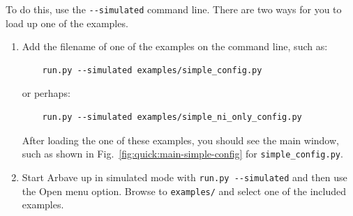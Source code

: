 To do this, use the \verb|--simulated| command line.  There are two ways for you
to load up one of the examples.
\begin{enumerate}
  \item Add the filename of one of the examples on the command line, such as:\\
    \begin{verbatim}
    run.py --simulated examples/simple_config.py
    \end{verbatim}
    or perhaps:
    \begin{verbatim}
    run.py --simulated examples/simple_ni_only_config.py
    \end{verbatim}
    After loading the one of these examples, you should see the main window,
    such as shown in Fig.~\ref{fig:quick:main-simple-config} for \verb|simple_config.py|.
  \item Start Arbave up in simulated mode with \verb|run.py --simulated| and
  then use the Open menu option.  Browse to \verb|examples/| and select one of
  the included examples.
\end{enumerate}
